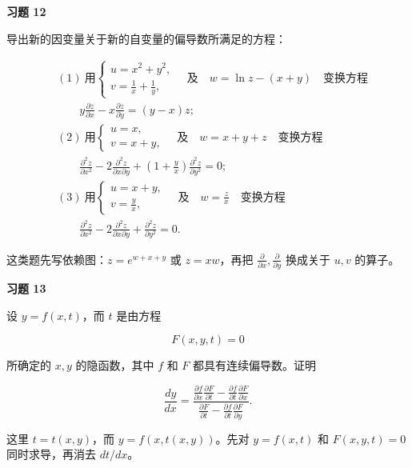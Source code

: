 \begin{exercisebox}
\textbf{习题 12}

导出新的因变量关于新的自变量的偏导数所满足的方程：

\[
      \begin{aligned}
      &(1)\ \text{用}
      \begin{cases}
      u=x^2+y^2,\\
      v=\frac1x+\frac1y,
      \end{cases}
      \quad \text{及}\quad w=\ln z-(x+y)
      \quad \text{变换方程}\\
      &\qquad
      y\frac{\partial z}{\partial x}
      -
      x\frac{\partial z}{\partial y}
      =
      (y-x)z;\\[4pt]
      &(2)\ \text{用}
      \begin{cases}
      u=x,\\
      v=x+y,
      \end{cases}
      \quad \text{及}\quad w=x+y+z
      \quad \text{变换方程}\\
      &\qquad
      \frac{\partial^2 z}{\partial x^2}
      -
      2\frac{\partial^2 z}{\partial x\partial y}
      +
      \left(1+\frac{y}{x}\right)
      \frac{\partial^2 z}{\partial y^2}=0;\\[4pt]
      &(3)\ \text{用}
      \begin{cases}
      u=x+y,\\
      v=\frac{y}{x},
      \end{cases}
      \quad \text{及}\quad w=\frac{z}{x}
      \quad \text{变换方程}\\
      &\qquad
      \frac{\partial^2 z}{\partial x^2}
      -
      2\frac{\partial^2 z}{\partial x\partial y}
      +
      \frac{\partial^2 z}{\partial y^2}=0.
      \end{aligned}
      \]

\begin{hintbox}
这类题先写依赖图：\(z=e^{w+x+y}\) 或 \(z=xw\)，再把 \(\frac{\partial}{\partial x},\frac{\partial}{\partial y}\) 换成关于 \(u,v\) 的算子。
\end{hintbox}
\end{exercisebox}

\begin{exercisebox}
\textbf{习题 13}

设 \(y=f(x,t)\)，而 \(t\) 是由方程

\[
        F(x,y,t)=0
      \]

所确定的 \(x,y\) 的隐函数，其中 \(f\) 和 \(F\) 都具有连续偏导数。证明

\[
        \frac{dy}{dx}
        =
        \frac{
        \frac{\partial f}{\partial x}\frac{\partial F}{\partial t}
        -
        \frac{\partial f}{\partial t}\frac{\partial F}{\partial x}
        }{
        \frac{\partial F}{\partial t}
        -
        \frac{\partial f}{\partial t}\frac{\partial F}{\partial y}
        }.
      \]

\begin{hintbox}
这里 \(t=t(x,y)\)，而 \(y=f(x,t(x,y))\)。先对 \(y=f(x,t)\) 和 \(F(x,y,t)=0\) 同时求导，再消去 \(dt/dx\)。
\end{hintbox}
\end{exercisebox}

